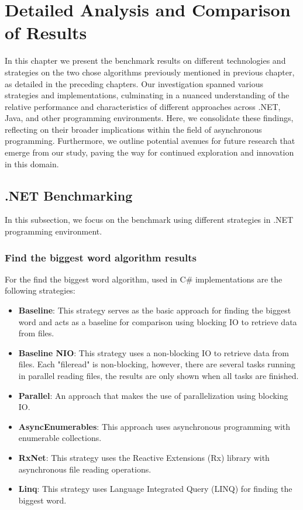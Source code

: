 
\chapter{Detailed Analysis and Comparison of Results}
\label{cha:conclusions_future_directions}
In this chapter we present the benchmark results on different technologies and strategies on the two chose algorithms previously mentioned in previous chapter, as detailed in the preceding chapters. Our investigation spanned various strategies and implementations, culminating in a nuanced understanding of the relative performance and characteristics of different approaches across .NET, Java, and other programming environments. Here, we consolidate these findings, reflecting on their broader implications within the field of asynchronous programming. Furthermore, we outline potential avenues for future research that emerge from our study, paving the way for continued exploration and innovation in this domain.


\section{.NET Benchmarking}
\label{sec:dotnet_implementation}

In this subsection, we focus on the benchmark using different strategies in .NET programming environment.

\subsection{Find the biggest word algorithm results}
\label{subsubsec:biggest_word_results_cs}

For the find the biggest word algorithm, used in C\# implementations are the following strategies:
\begin{itemize}
    \item \textbf{Baseline}: This strategy serves as the basic approach for finding the biggest word and acts as a baseline for comparison using blocking IO to retrieve data from files.
    \item \textbf{Baseline NIO}: This strategy uses a non-blocking IO to retrieve data from files. Each "fileread" is non-blocking, however, there are several tasks running in parallel reading files, the results are only shown when all tasks are finished. 
    \item \textbf{Parallel}: An approach that makes the use of parallelization using blocking IO.
    \item \textbf{AsyncEnumerables}: This approach uses asynchronous programming with enumerable collections.
    \item \textbf{RxNet}: This strategy uses the Reactive Extensions (Rx) library with asynchronous file reading operations.
    \item \textbf{Linq}: This strategy uses Language Integrated Query (LINQ) for finding the biggest word.
\end{itemize}

